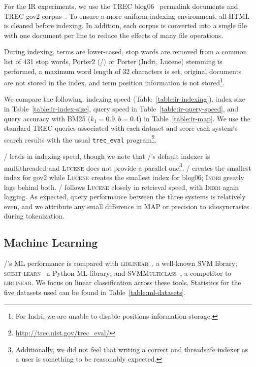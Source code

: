 For the IR experiments, we use the TREC blog06~\cite{blog06} permalink documents
and TREC gov2 corpus~\cite{gov2}. To ensure a more uniform indexing environment,
all HTML is cleaned before indexing. In addition, each corpus is converted into
a single file with one document per line to reduce the effects of many file
operations.

During indexing, terms are lower-cased, stop words are removed from a common
list of 431 stop words, Porter2 (\meta/) or Porter (Indri, Lucene) stemming is
performed, a maximum word length of 32 characters is set, original documents are
not stored in the index, and term position information is not
stored\footnote{For Indri, we are unable to disable positions information
storage.}.

We compare the following: indexing speed (Table~\ref{table:ir-indexing}), index
size in Table~\ref{table:ir-index-size}, query speed in
Table~\ref{table:ir-query-speed}, and query accuracy with BM25 ($k_1=0.9,
b=0.4$) in Table~\ref{table:ir-map}. We use the standard TREC queries associated
with each dataset and score each system's search results with the usual
\texttt{trec\_eval} program\footnote{\url{http://trec.nist.gov/trec_eval/}}.

\meta/ leads in indexing speed, though we note that \meta/'s default
indexer is multithreaded and \textsc{Lucene} does not provide a parallel
one\footnote{Additionally, we did not feel that writing a correct and threadsafe
indexer as a user is something to be reasonably expected.}. \meta/ creates the
smallest index for gov2 while \textsc{Lucene} creates the smallest index for
blog06; \textsc{Indri} greatly lags behind both. \meta/ follows \textsc{Lucene}
closely in retrieval speed, with \textsc{Indri} again lagging. As expected,
query performance between the three systems is relatively even, and we attribute
any small difference in MAP or precision to idiosyncrasies during tokenization.







\subsection{Machine Learning}

\meta/'s ML performance is compared with \textsc{liblinear}~\cite{liblinear}, a
well-known SVM library; \textsc{scikit-learn}~\cite{scikit} a Python ML library;
and \textsc{SVMMulticlass}~\cite{svmmulticlass}, a competitor to
\textsc{liblinear}. We focus on linear classification across these tools.
Statistics for the five datasets used can be found in
Table~\ref{table:ml-datasets}.

